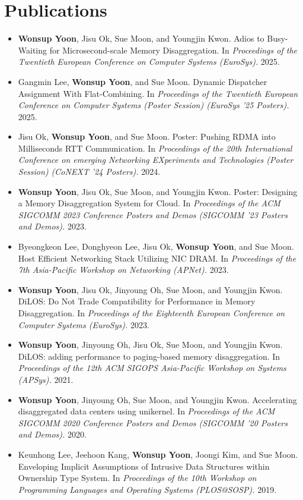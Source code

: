 \documentclass[letterpaper,11pt]{article}
\newcommand{\resumePub}[1]{
  \item\small{#1 \vspace{-2pt}}
}
\newcommand{\resumeSubHeadingListStart}{\begin{itemize}[leftmargin=*]}
\newcommand{\resumeSubHeadingListEnd}{\end{itemize}}
\begin{document}
\section{Publications}
\resumeSubHeadingListStart
\resumePub{\textbf{Wonsup Yoon}, Jisu Ok, Sue Moon, and Youngjin Kwon. Adios to Busy-Waiting for Microsecond-scale Memory Disaggregation. In \textit{Proceedings of the Twentieth European Conference on Computer Systems (EuroSys).} 2025.}
\resumePub{Gangmin Lee, \textbf{Wonsup Yoon}, and Sue Moon. Dynamic Dispatcher Assignment With Flat-Combining. In \textit{Proceedings of the Twentieth European Conference on Computer Systems (Poster Session) (EuroSys '25 Posters).} 2025.}
\resumePub{Jisu Ok, \textbf{Wonsup Yoon}, and Sue Moon. Poster: Pushing RDMA into Milliseconds RTT Communication. In \textit{Proceedings of the 20th International Conference on emerging Networking EXperiments and Technologies (Poster Session) (CoNEXT '24 Posters).} 2024.}
\resumePub{\textbf{Wonsup Yoon}, Jisu Ok, Sue Moon, and Youngjin Kwon. Poster: Designing a Memory Disaggregation System for Cloud. In \textit{Proceedings of the ACM SIGCOMM 2023 Conference Posters and Demos (SIGCOMM '23 Posters and Demos).} 2023.}
\resumePub{Byeongkeon Lee, Donghyeon Lee, Jisu Ok, \textbf{Wonsup Yoon}, and Sue Moon. Host Efficient Networking Stack Utilizing NIC DRAM. In \textit{Proceedings of the 7th Asia-Pacific Workshop on Networking (APNet).} 2023.}
\resumePub{\textbf{Wonsup Yoon}, Jisu Ok, Jinyoung Oh, Sue Moon, and Youngjin Kwon. DiLOS: Do Not Trade Compatibility for Performance in Memory Disaggregation. In \textit{Proceedings of the Eighteenth European Conference on Computer Systems (EuroSys).} 2023.}
\resumePub{\textbf{Wonsup Yoon}, Jinyoung Oh, Jisu Ok, Sue Moon, and Youngjin Kwon. DiLOS: adding performance to paging-based memory disaggregation. In \textit{Proceedings of the 12th ACM SIGOPS Asia-Pacific Workshop on Systems (APSys).} 2021.}
\resumePub{\textbf{Wonsup Yoon}, Jinyoung Oh, Sue Moon, and Youngjin Kwon. Accelerating disaggregated data centers using unikernel. In \textit{Proceedings of the ACM SIGCOMM 2020 Conference Posters and Demos (SIGCOMM '20 Posters and Demos).} 2020.}
\resumePub{Keunhong Lee, Jeehoon Kang, \textbf{Wonsup Yoon}, Joongi Kim, and Sue Moon. Enveloping Implicit Assumptions of Intrusive Data Structures within Ownership Type System. In \textit{Proceedings of the 10th Workshop on Programming Languages and Operating Systems (PLOS@SOSP).} 2019.}
\resumeSubHeadingListEnd
\end{document}
